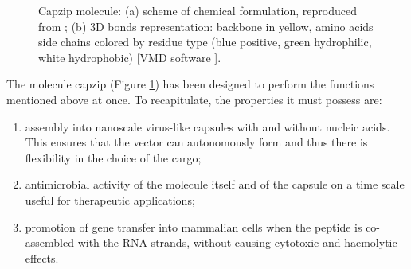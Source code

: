 \begin{figure}
\begin{center}
 \hspace{0.5cm}
\caption[Cazip molecule]{Capzip molecule: (a) scheme of chemical formulation, reproduced from \citet{Castelletto2016}; (b) 3D bonds representation: backbone in yellow, amino acids side chains colored by residue type (blue positive, green hydrophilic, white hydrophobic) [VMD software \citet{HUMP96}].} \label{fig:capzip}
\end{center}
\end{figure}

The molecule capzip \citep{Castelletto2016} (Figure \ref{fig:capzip}) has been designed to perform the functions mentioned above at once. To recapitulate, the properties it must possess are:
\begin{enumerate}
\item assembly into nanoscale virus-like capsules with and without nucleic acids. This ensures that the vector can autonomously form and thus there is flexibility in the choice of the cargo;
\item antimicrobial activity of the molecule itself and of the capsule on a time scale useful for therapeutic applications;
\item promotion of gene transfer into mammalian cells when the peptide is co-assembled with the RNA strands, without causing cytotoxic and haemolytic effects.
\end{enumerate}

